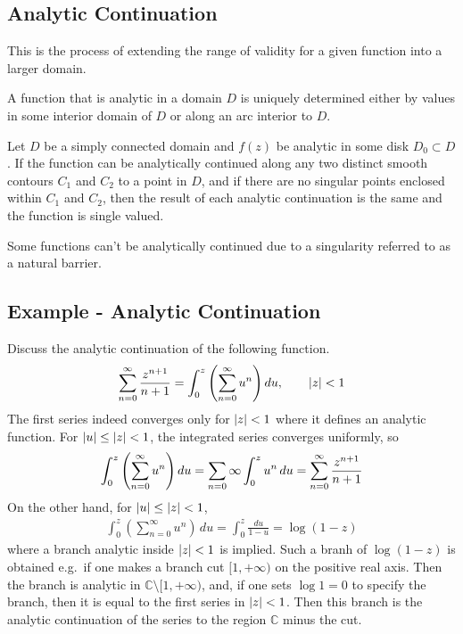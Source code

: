     \subsection{Analytic Continuation}
    This is the process of extending the range of validity for a given
    function into a larger domain.
    \begin{thm}
        A function that is analytic in a domain $D$ is uniquely determined
        either by values in some interior domain of $D$ or along an arc
        interior to $D$.
    \end{thm}
    \begin{thm}
        Let $D$ be a simply connected domain and $f(z)$ be analytic in some
        disk $D_0 \subset D$. If the function can be analytically continued
        along any two distinct smooth contours $C_1$ and $C_2$ to a point in
        $D$, and if there are no singular points enclosed within $C_1$ and
        $C_2$, then the result of each analytic continuation is the same and
        the function is single valued.
    \end{thm}
    Some functions can't be analytically continued due to a singularity
    referred to as a natural barrier.

    \subsection{Example - Analytic Continuation}
    Discuss the analytic continuation of the following function.
    \begin{align*}
        \sum_{n=0}^\infty \frac{z^{n+1}}{n+1} =
        \int_0^z {\left( \sum_{n=0}^\infty u^n \right)} \, du,
        \qquad \left\lvert z \right\rvert < 1
    \end{align*}
    The first series indeed converges only for $\left\lvert z \right\rvert < 1$ where it defines an
    analytic function. For $\left\lvert u \right\rvert \le \left\lvert z \right\rvert < 1$, the integrated series
    converges uniformly, so
    \begin{align*}
        \int_0^z {\left( \sum_{n=0}^\infty u^n \right)} \, du =
        \sum_{n=0}\infty \int_0^z u^n \, du =
        \sum_{n=0}^\infty \frac{z^{n+1}}{n+1}
    \end{align*}
    On the other hand, for $\left\lvert u \right\rvert \le \left\lvert z \right\rvert < 1$,
    \begin{align*}
        \int_0^z \left(\sum_{n=0}^\infty u^n\right) \, du =
        \int_0^z \frac{du}{1-u} = \log(1-z)
    \end{align*}
    where a branch analytic inside $\left\lvert z \right\rvert < 1$ is implied. Such a branh of
    $\log(1-z)$ is obtained e.g.\ if one makes a branch cut $[1,+\infty)$ on the
    positive real axis. Then the branch is analytic in
    $\mathbb{C}\setminus[1,+\infty)$, and, if one sets $\log 1 = 0$ to specify
    the branch, then it is equal to the first series in $\left\lvert z \right\rvert < 1$. Then this
    branch is the analytic continuation of the series to the region $\mathbb{C}$
    minus the cut.

